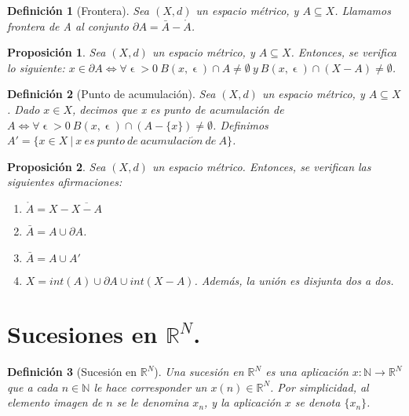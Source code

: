 \documentclass[11pt, a4paper, titlepage]{article}
\let\epsilon\upvarepsilon
\theoremstyle{theorem-style}
\newtheorem*{nprop}{Proposición}
\theoremstyle{definition-style}
\newtheorem*{ndef}{Definición}
\theoremstyle{remark-style}
\theoremstyle{example-style}
\newenvironment{nlist}
{\begin{enumerate}
\renewcommand\labelenumi{(\emph{\roman{enumi})}}}
{\end{enumerate}}
\begin{document}
\begin{ndef}[Frontera]
Sea $(X,d)$ un espacio métrico, y $A\subseteq X$. Llamamos \textit{frontera de A} al conjunto $\partial A = \bar{A}-\mathring{A}$.	
\end{ndef}



\begin{nprop}
Sea $(X,d)$ un espacio métrico, y $A\subseteq X$. Entonces, se verifica lo siguiente:
$x\in \partial A \iff \forall \epsilon > 0\ B(x,\epsilon)\cap A \neq \emptyset \ y\ B(x,\epsilon)\cap (X-A) \neq \emptyset$.
\end{nprop}



\begin{ndef}[Punto de acumulación]
Sea $(X,d)$ un espacio métrico, y $A\subseteq X$. Dado $x\in X$, decimos que \textit{x es punto de acumulación de} $A \iff \forall \epsilon > 0\ B(x,\epsilon)\cap (A-\{x\})\neq \emptyset$. Definimos $A' = \{ x\in X \ | \ x\ es\ punto\ de\ acumulaci\acute{o}n\ de\ A \}$.
\end{ndef}



\begin{nprop}
Sea $(X,d)$ un espacio métrico. Entonces, se verifican las siguientes afirmaciones:

\begin{nlist}
\item $\mathring{A} = X - \overline{X-A}$

\item $\bar{A} = A \cup \partial A$.

\item $\bar{A} = A \cup A'$

\item $X = int(A) \cup \partial A \cup int(X-A)$. Además, la unión es disjunta dos a dos.
\end{nlist}

\end{nprop}

\newpage


\section{Sucesiones en $\mathbb{R}^N$.}



\begin{ndef}[Sucesión en $\mathbb{R}^N$]
Una sucesión en $\mathbb{R}^N$ es una aplicación $x: \mathbb{N} \longrightarrow \mathbb{R}^N$ que a cada $n\in \mathbb{N}$ le hace corresponder un $x(n) \in \mathbb{R}^N$. Por simplicidad, al elemento imagen de $n$ se le denomina $x_n$, y la aplicación $x$ se denota $\{x_n\}$.
\end{ndef}
\end{document}
